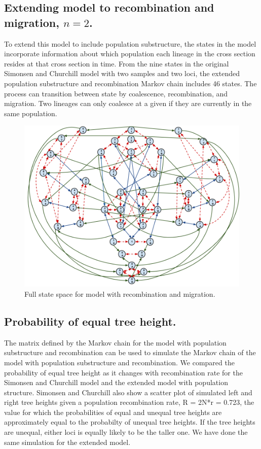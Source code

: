 \documentclass[11pt,oneside]{amsart}
\begin{document}
\subsection{Extending model to recombination and migration, $n = 2$.}

To extend this model to include population substructure, the states in the model incorporate information about which population each lineage in the cross section resides at that cross section in time. From the nine states in the original Simonsen and Churchill model with two samples and two loci, the extended population substructure and recombination Markov chain includes 46 states. The process can transition between state by coalescence, recombination, and migration. Two lineages can only coalesce at a given if they are currently in the same population.
\begin{figure}[ht]
\centering
\includegraphics[width=1.0\textwidth]{Markov_recomb_mig.png}
\caption{Full state space for model with recombination and migration.}
\label{Figure: recomb mig}
\end{figure}

\subsection{Probability of equal tree height.}

The matrix defined by the Markov chain for the model with population substructure and recombination can be used to simulate the Markov chain of the model with population substructure and recombination. We compared the probability of equal tree height as it changes with recombination rate for the Simonsen and Churchill model and the extended model with population structure. Simonsen and Churchill also show a scatter plot of simulated left and right tree heights given a population recombination rate, R = 2N*r = 0.723, the value for which the probabilities of equal and unequal tree heights are approximately equal to the probabilty of unequal tree heights. If the tree heights are unequal, either loci is equally likely to be the taller one. We have done the same simulation for the extended model.
\end{document}
